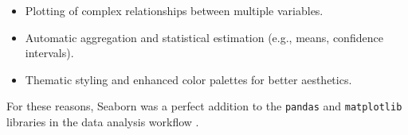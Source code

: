 \begin{itemize}
    \item Plotting of complex relationships between multiple variables.
    \item Automatic aggregation and statistical estimation (e.g., means, confidence intervals).
    \item Thematic styling and enhanced color palettes for better aesthetics.
\end{itemize}
For these reasons, Seaborn was a perfect addition to the \texttt{pandas} and \texttt{matplotlib} libraries in the data analysis workflow \cite{seaborn_wiki}.